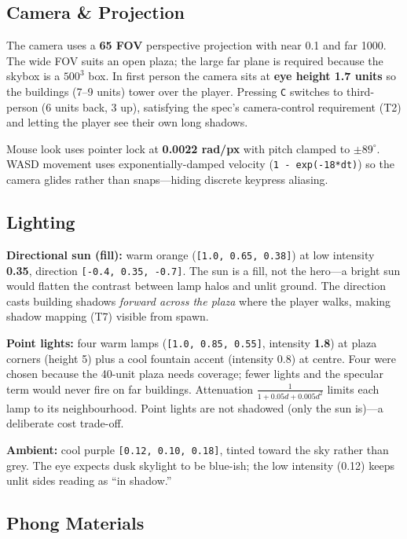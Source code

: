 \documentclass[10pt,a4paper]{article}
\begin{document}
\subsection{Camera \& Projection}

The camera uses a \textbf{65\textdegree{} FOV} perspective projection with near 0.1 and
far 1000. The wide FOV suits an open plaza; the large far plane is required because the
skybox is a $500^3$ box. In first person the camera sits at \textbf{eye height 1.7 units}
so the buildings (7--9 units) tower over the player. Pressing \texttt{C} switches to
third-person (6 units back, 3 up), satisfying the spec's camera-control requirement (T2)
and letting the player see their own long shadows.

Mouse look uses pointer lock at \textbf{0.0022 rad/px} with pitch clamped to
$\pm 89^{\circ}$. WASD movement uses exponentially-damped velocity
(\texttt{1 - exp(-18*dt)}) so the camera glides rather than snaps---hiding discrete
keypress aliasing.

\subsection{Lighting}

\textbf{Directional sun (fill):} warm orange (\texttt{[1.0, 0.65, 0.38]}) at low
intensity \textbf{0.35}, direction \texttt{[-0.4, 0.35, -0.7]}. The sun is a fill, not the
hero---a bright sun would flatten the contrast between lamp halos and unlit ground. The
direction casts building shadows \emph{forward across the plaza} where the player walks,
making shadow mapping (T7) visible from spawn.

\textbf{Point lights:} four warm lamps (\texttt{[1.0, 0.85, 0.55]}, intensity
\textbf{1.8}) at plaza corners (height 5) plus a cool fountain accent (intensity 0.8) at
centre. Four were chosen because the 40-unit plaza needs coverage; fewer lights and the
specular term would never fire on far buildings. Attenuation
$\frac{1}{1+0.05d+0.005d^2}$ limits each lamp to its neighbourhood. Point lights are not
shadowed (only the sun is)---a deliberate cost trade-off.

\textbf{Ambient:} cool purple \texttt{[0.12, 0.10, 0.18]}, tinted toward the sky rather
than grey. The eye expects dusk skylight to be blue-ish; the low intensity (0.12) keeps
unlit sides reading as ``in shadow.''

\subsection{Phong Materials}
\end{document}
